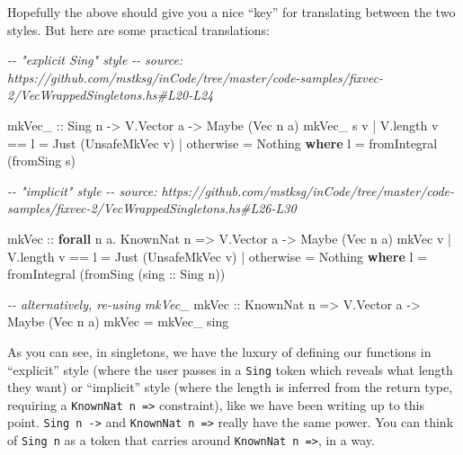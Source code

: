 \documentclass[]{article}
\newenvironment{Shaded}{}{}
\newcommand{\CommentTok}[1]{\textcolor[rgb]{0.38,0.63,0.69}{\textit{#1}}}
\newcommand{\DataTypeTok}[1]{\textcolor[rgb]{0.56,0.13,0.00}{#1}}
\newcommand{\FunctionTok}[1]{\textcolor[rgb]{0.02,0.16,0.49}{#1}}
\newcommand{\KeywordTok}[1]{\textcolor[rgb]{0.00,0.44,0.13}{\textbf{#1}}}
\newcommand{\NormalTok}[1]{#1}
\newcommand{\OperatorTok}[1]{\textcolor[rgb]{0.40,0.40,0.40}{#1}}
\newcommand{\OtherTok}[1]{\textcolor[rgb]{0.00,0.44,0.13}{#1}}
\begin{document}
Hopefully the above should give you a nice ``key'' for translating between the
two styles. But here are some practical translations:

\begin{Shaded}
\begin{Highlighting}[]
\CommentTok{{-}{-} "explicit Sing" style}
\CommentTok{{-}{-} source: https://github.com/mstksg/inCode/tree/master/code{-}samples/fixvec{-}2/VecWrappedSingletons.hs\#L20{-}L24}

\OtherTok{mkVec\_ ::} \DataTypeTok{Sing}\NormalTok{ n }\OtherTok{{-}>} \DataTypeTok{V.Vector}\NormalTok{ a }\OtherTok{{-}>} \DataTypeTok{Maybe}\NormalTok{ (}\DataTypeTok{Vec}\NormalTok{ n a)}
\NormalTok{mkVec\_ s v }\OperatorTok{|}\NormalTok{ V.length v }\OperatorTok{==}\NormalTok{ l }\OtherTok{=} \DataTypeTok{Just}\NormalTok{ (}\DataTypeTok{UnsafeMkVec}\NormalTok{ v)}
           \OperatorTok{|} \FunctionTok{otherwise}       \OtherTok{=} \DataTypeTok{Nothing}
  \KeywordTok{where}
\NormalTok{    l }\OtherTok{=} \FunctionTok{fromIntegral}\NormalTok{ (fromSing s)}

\CommentTok{{-}{-} "implicit" style}
\CommentTok{{-}{-} source: https://github.com/mstksg/inCode/tree/master/code{-}samples/fixvec{-}2/VecWrappedSingletons.hs\#L26{-}L30}

\OtherTok{mkVec ::} \KeywordTok{forall}\NormalTok{ n a}\OperatorTok{.} \DataTypeTok{KnownNat}\NormalTok{ n }\OtherTok{=>} \DataTypeTok{V.Vector}\NormalTok{ a }\OtherTok{{-}>} \DataTypeTok{Maybe}\NormalTok{ (}\DataTypeTok{Vec}\NormalTok{ n a)}
\NormalTok{mkVec v }\OperatorTok{|}\NormalTok{ V.length v }\OperatorTok{==}\NormalTok{ l }\OtherTok{=} \DataTypeTok{Just}\NormalTok{ (}\DataTypeTok{UnsafeMkVec}\NormalTok{ v)}
        \OperatorTok{|} \FunctionTok{otherwise}       \OtherTok{=} \DataTypeTok{Nothing}
  \KeywordTok{where}
\NormalTok{    l }\OtherTok{=} \FunctionTok{fromIntegral}\NormalTok{ (fromSing (}\OtherTok{sing ::} \DataTypeTok{Sing}\NormalTok{ n))}

\CommentTok{{-}{-} alternatively, re{-}using \textasciigrave{}mkVec\_\textasciigrave{}}
\OtherTok{mkVec ::} \DataTypeTok{KnownNat}\NormalTok{ n }\OtherTok{=>} \DataTypeTok{V.Vector}\NormalTok{ a }\OtherTok{{-}>} \DataTypeTok{Maybe}\NormalTok{ (}\DataTypeTok{Vec}\NormalTok{ n a)}
\NormalTok{mkVec }\OtherTok{=}\NormalTok{ mkVec\_ sing}
\end{Highlighting}
\end{Shaded}

As you can see, in singletons, we have the luxury of defining our functions in
``explicit'' style (where the user passes in a \texttt{Sing} token which reveals
what length they want) or ``implicit'' style (where the length is inferred from
the return type, requiring a \texttt{KnownNat\ n\ =\textgreater{}} constraint),
like we have been writing up to this point. \texttt{Sing\ n\ -\textgreater{}}
and \texttt{KnownNat\ n\ =\textgreater{}} really have the same power. You can
think of \texttt{Sing\ n} as a token that carries around
\texttt{KnownNat\ n\ =\textgreater{}}, in a way.
\end{document}

